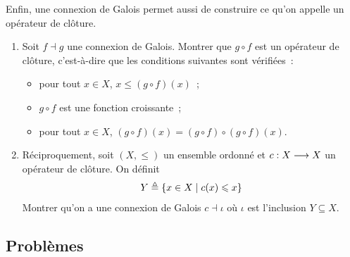 \begin{exercise}
\begin{enumerate}[resume]
  \end{enumerate}
  Enfin, une connexion de Galois permet aussi de construire ce qu'on appelle
  un opérateur de clôture.
  \begin{enumerate}[resume]
  \item Soit $f\dashv g$ une connexion de Galois. Montrer que $g\circ f$ est
    un opérateur de clôture, c'est-à-dire que les conditions suivantes sont
    vérifiées~:
    \begin{itemize}
    \item pour tout $x \in X$, $x \leq (g\circ f)(x)$~;
    \item $g\circ f$ est une fonction croissante~;
    \item pour tout $x \in X$, $(g\circ f)(x) = (g\circ f)\circ(g\circ f)(x)$.
    \end{itemize}
  \item Réciproquement, soit $(X,\leq)$ un ensemble ordonné et
    $c : \displaystyle X \longrightarrow X$ un opérateur de clôture. On définit
    \[Y \triangleq \left\{ x \in X \;\middle\vert\; c(x) \leqslant x \right\}\]
    Montrer qu'on a une connexion de Galois $c\dashv \iota$ où $\iota$ est
    l'inclusion $Y\subseteq X$.
  \end{enumerate}
\end{exercise}

\clearpage

\subsection{Problèmes}

